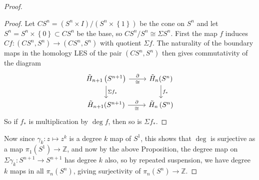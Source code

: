 \begin{proof}
    \begin{proof}
        Let $C S^{n} = \left( S^{n} \times I \right) /
        \left( S^{n} \times \left\{ 1 \right\}  \right) $ 
        be the cone on $S^{n}$ and let
        $S^{n} = S^{n}\times \left\{ 0 \right\} \subset 
        CS^{n}$ be the base, so $CS^{n} / S^{n} \cong
        \Sigma S^{n}$. First the map
        $f$ induces $Cf \colon \left( CS^{n}, S^{n} \right) 
        \to \left( CS^{n} , S^{n} \right) $ with
        quotient $\Sigma f$. The naturality of the boundary
        maps in the homology LES of the pair $\left( CS^{n},
        S^{n}\right) $ then gives commutativity
        of the diagram
        \begin{equation*}
        \begin{tikzcd}
            \tilde{H}_{n+1}\left( S^{n+1} \right) 
            \ar[r, "\partial", "\cong"']
            \ar[d, "\Sigma f_*"]& \tilde{H}_n(S^{n}) 
            \ar[d, "f_*"]\\
            \tilde{H}_{n+1}(S^{n+1}) \ar[r, "\partial", 
            "\cong"'] & \tilde{H}_n \left( S^{n} \right) 
        \end{tikzcd}
        \end{equation*}
        So if $f_*$ is multiplication by
        $\deg f$, then so is $\Sigma f_*$.
    \end{proof}

    Now since 
    $\gamma_k \colon z \mapsto z^{k}$ is a degree $k$ map of
    $S^{1}$, this shows that $\deg$ is surjective
    as a map $\pi_1\left( S^{1} \right) \to \mathbb{Z}$, and
    now by the above Proposition, the degree
    map on
    $\Sigma \gamma_k \colon S^{n+1} \to S^{n+1}$ has
    degree $k$ also, so by repeated suspension, we
    have degree $k$ maps in all $\pi_n\left( S^{n} \right) $,
    giving surjectivity of
    $\pi_n \left( S^{n} \right) \to \mathbb{Z}$.




\end{proof}



